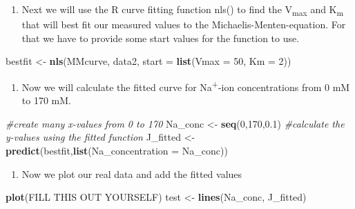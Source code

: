 \documentclass[
]{book}
\newenvironment{Shaded}{\begin{snugshade}}{\end{snugshade}}
\newcommand{\AttributeTok}[1]{\textcolor[rgb]{0.13,0.29,0.53}{#1}}
\newcommand{\CommentTok}[1]{\textcolor[rgb]{0.56,0.35,0.01}{\textit{#1}}}
\newcommand{\DecValTok}[1]{\textcolor[rgb]{0.00,0.00,0.81}{#1}}
\newcommand{\FloatTok}[1]{\textcolor[rgb]{0.00,0.00,0.81}{#1}}
\newcommand{\FunctionTok}[1]{\textcolor[rgb]{0.13,0.29,0.53}{\textbf{#1}}}
\newcommand{\NormalTok}[1]{#1}
\newcommand{\OtherTok}[1]{\textcolor[rgb]{0.56,0.35,0.01}{#1}}
\providecommand{\tightlist}{%
  \setlength{\itemsep}{0pt}\setlength{\parskip}{0pt}}
\begin{document}
\begin{enumerate}
\def\labelenumi{\arabic{enumi}.}
\setcounter{enumi}{1}
\tightlist
\item
  Next we will use the R curve fitting function nls() to find the V\textsubscript{max} and K\textsubscript{m} that will best fit our measured values to the Michaelis-Menten-equation. For that we have to provide some start values for the function to use.
\end{enumerate}

\begin{Shaded}
\begin{Highlighting}[]
\NormalTok{bestfit }\OtherTok{\textless{}{-}} \FunctionTok{nls}\NormalTok{(MMcurve, data2, }\AttributeTok{start =} \FunctionTok{list}\NormalTok{(}\AttributeTok{Vmax =} \DecValTok{50}\NormalTok{, }\AttributeTok{Km =} \DecValTok{2}\NormalTok{))}
\end{Highlighting}
\end{Shaded}

\begin{enumerate}
\def\labelenumi{\arabic{enumi}.}
\setcounter{enumi}{2}
\tightlist
\item
  Now we will calculate the fitted curve for Na\textsuperscript{+}-ion concentrations from 0 mM to 170 mM.
\end{enumerate}

\begin{Shaded}
\begin{Highlighting}[]
\CommentTok{\#create many x{-}values from 0 to 170}
\NormalTok{Na\_conc }\OtherTok{\textless{}{-}} \FunctionTok{seq}\NormalTok{(}\DecValTok{0}\NormalTok{,}\DecValTok{170}\NormalTok{,}\FloatTok{0.1}\NormalTok{) }
\CommentTok{\#calculate the y{-}values using the fitted function}
\NormalTok{J\_fitted }\OtherTok{\textless{}{-}} \FunctionTok{predict}\NormalTok{(bestfit,}\FunctionTok{list}\NormalTok{(}\AttributeTok{Na\_concentration =}\NormalTok{ Na\_conc))}
\end{Highlighting}
\end{Shaded}

\begin{enumerate}
\def\labelenumi{\arabic{enumi}.}
\setcounter{enumi}{3}
\tightlist
\item
  Now we plot our real data and add the fitted values
\end{enumerate}

\begin{Shaded}
\begin{Highlighting}[]
\FunctionTok{plot}\NormalTok{(FILL THIS OUT YOURSELF)}
\NormalTok{test }\OtherTok{\textless{}{-}} \FunctionTok{lines}\NormalTok{(Na\_conc, J\_fitted)}
\end{Highlighting}
\end{Shaded}
\end{document}
